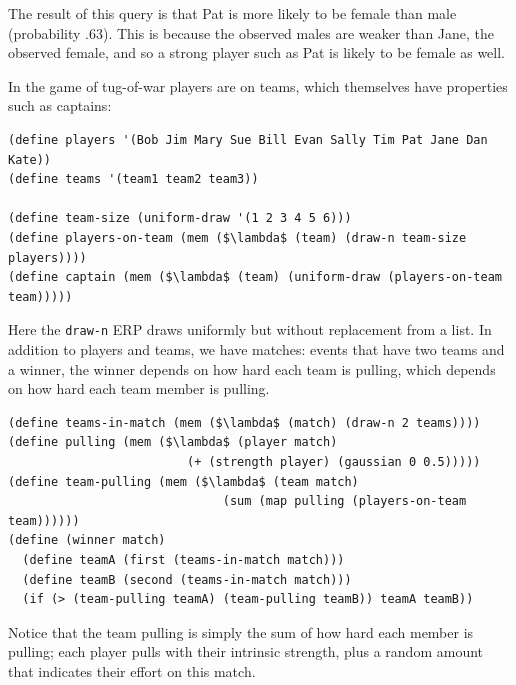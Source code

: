\documentclass[pdfextras]{handbook}
\begin{document}
The result of this query is that Pat is more likely to be female than male (probability .63). 
This is because the observed males are weaker than Jane, the observed female, and so a strong player such as Pat is likely to be female as well.

In the game of tug-of-war players are on teams, which themselves have properties such as captains:
\begin{lstlisting}[mathescape]
(define players '(Bob Jim Mary Sue Bill Evan Sally Tim Pat Jane Dan Kate))
(define teams '(team1 team2 team3))

(define team-size (uniform-draw '(1 2 3 4 5 6)))
(define players-on-team (mem ($\lambda$ (team) (draw-n team-size players))))
(define captain (mem ($\lambda$ (team) (uniform-draw (players-on-team team)))))
\end{lstlisting}
%
Here the \lstinline{draw-n} ERP draws uniformly but without replacement from a list.
%
In addition to players and teams, we have matches: events that have two teams and a winner, the winner depends on how hard each team is pulling, which depends on how hard each team member is pulling.
\begin{lstlisting}[mathescape]
(define teams-in-match (mem ($\lambda$ (match) (draw-n 2 teams))))
(define pulling (mem ($\lambda$ (player match) 
                         (+ (strength player) (gaussian 0 0.5)))))
(define team-pulling (mem ($\lambda$ (team match) 
                              (sum (map pulling (players-on-team team))))))
(define (winner match) 
  (define teamA (first (teams-in-match match)))
  (define teamB (second (teams-in-match match)))
  (if (> (team-pulling teamA) (team-pulling teamB)) teamA teamB))
\end{lstlisting}
Notice that the team pulling is simply the sum of how hard each member is pulling; each player pulls with their intrinsic strength, plus a random amount that indicates their effort on this match. 
 
\end{document}
